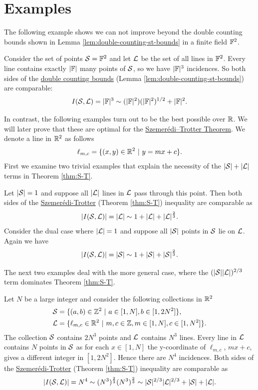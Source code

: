 \section{Examples}
The following example shows we can not improve beyond the double counting bounds shown in Lemma \ref{lem:double-counting-st-bounds} in a finite field $\mathbb F^2$. 
\begin{example}
Consider the set of points $\mathcal S=\mathbb F^2$ and let $\mathcal L$ be the set of all lines 
in $\mathbb F^2$. Every line contains exactly $|\mathbb F|$ many points of $\mathcal S$, so we have $|\mathbb F|^3$ incidences. 
So both sides of the \hyperref[lem:double-counting-st-bounds]{double counting bounds} (Lemma \ref{lem:double-counting-st-bounds}) are comparable:
\[
I(\mathcal S,\mathcal L) = |\mathbb F|^3 \sim (|\mathbb F|^2)(|\mathbb F|^2)^{1/2} + |\mathbb F|^2.
\]
\end{example}
In contrast, the following examples turn out to be the best possible over $\mathbb R$. We will later prove that these are optimal for the \hyperref[thm:S-T]{Szemerédi–Trotter Theorem}.
We denote a line in $\mathbb R^2$ as follows
\[
    \ell_{m,c} = \{(x,y) \in \mathbb R^2 \ | \ y = mx+c\}.     
\]
First we examine two trivial examples that explain the necessity of the $|\mathcal S| + |\mathcal L|$ terms in Theorem \ref{thm:S-T}.
\begin{example}
    Let $|\mathcal S| = 1$ and suppose all $|\mathcal L|$ lines in $\mathcal L$ pass through this point. Then both sides of the \hyperref[thm:S-T]{Szemerédi-Trotter} (Theorem \ref{thm:S-T}) inequality are comparable as
    \[  
        |I(\mathcal S,\mathcal L)| = |\mathcal L| \sim 1 + |\mathcal L| + |\mathcal L|^{\frac23}.   
    \]
    Consider the dual case where $|\mathcal L| = 1$ and suppose all $|\mathcal S|$ points in $\mathcal S$ lie on $\mathcal L$. Again we have
    \[
        |I(\mathcal S,\mathcal L)| = |\mathcal S| \sim 1 + |\mathcal S| + |\mathcal S|^{\frac23}. 
    \]
\end{example}
The next two examples deal with the more general case, where the $(|\mathcal S||\mathcal L|)^{2/3}$ term dominates Theorem \ref{thm:S-T}. 
\begin{example} \label{ex:ST-1}
    Let $N$ be a large integer and consider the following collections in $\mathbb R^2$
    \begin{align*}
    \mathcal S &= \{ (a,b) \in \mathbb Z^2 \ | \ a\in [1,N], b \in [1,2N^2] \}, \\
    \mathcal L &= \{ \ell_{m,c} \in \mathbb R^2 \ | \ m,c\in \mathbb Z, m\in [1,N], c \in [1,N^2] \}. \end{align*}
    The collection $\mathcal S$ contains $2N^3$ points and $\mathcal L$ contains $N^3$ lines. Every line in $\mathcal L$ contains $N$ points in $\mathcal S$ as for each $x \in [1,N]$  the y-coordinate of $\ell_{m,c}$, $ mx+c$, gives a different integer in $[1,2N^2]$.
    Hence there are $N^4$ incidences. Both sides of the \hyperref[thm:S-T]{Szemerédi-Trotter} (Theorem \ref{thm:S-T}) inequality are comparable as 
    $$ |I(\mathcal S,\mathcal L)| = N^4 \sim (N^3)^{\frac{2}{3}} (N^3)^{\frac{2}{3}} \sim |\mathcal S|^{2/3} |\mathcal L|^{2/3} + |\mathcal S| + |\mathcal L|.$$
\end{example}
